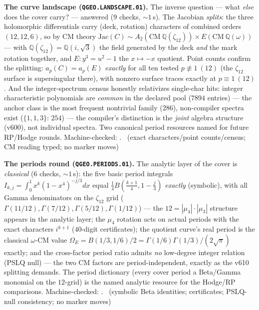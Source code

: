 \documentclass[11pt,a4paper]{article}
\theoremstyle{definition}
\begin{document}
\par\smallskip\noindent\textbf{The curve landscape
(\texttt{QGEO.LANDSCAPE.01}).}
The inverse question --- what \emph{else} does the cover carry? ---
answered ($9$ checks, ${\sim}1$\,s).  The Jacobian \emph{splits}: the
three holomorphic differentials carry (deck, rotation) characters of
combined orders $(12,12,6)$, so by CM theory
$\mathrm{Jac}(C)\sim A_2(\mathrm{CM}\ \mathbb{Q}(\zeta_{12}))\times
E(\mathrm{CM}\ \mathbb{Q}(\omega))$ --- with
$\mathbb{Q}(\zeta_{12})=\mathbb{Q}(i,\sqrt3)$ the field generated by
the deck \emph{and} the mark rotation together, and $E: y^3=u^2-1$
the $x\mapsto-x$ quotient.  Point counts confirm the splitting:
$a_p(C)=a_p(E)$ \emph{exactly} for all ten tested
$p\not\equiv1\ (12)$ (the $\zeta_{12}$ surface is supersingular
there), with nonzero surface traces exactly at $p\equiv1\ (12)$.
And the integer-spectrum census honestly relativizes single-char
hits: integer characteristic polynomials are \emph{common} in the
declared pool ($7894$ entries) --- the anchor class is the most
frequent nontrivial family ($286$), non-compiler spectra exist
($\{1,1,3\}$: $254$) --- the compiler's distinction is the
\emph{joint} algebra structure (v600), not individual spectra.  Two
canonical period resources named for future RP/Hodge rounds.
Machine-checked: .
\mE\ (exact characters/point counts/census; CM reading typed; no
marker moves)
\par\smallskip

\par\smallskip\noindent\textbf{The periods round
(\texttt{QGEO.PERIODS.01}).}
The analytic layer of the cover is \emph{classical} ($6$ checks,
${\sim}1$\,s): the five basic period integrals
$I_{k,j}=\int_0^1x^k(1-x^4)^{-j/3}dx$ equal
$\tfrac14B(\tfrac{k+1}4,1-\tfrac j3)$ \emph{exactly} (symbolic), with
all Gamma denominators on the $\zeta_{12}$ grid
($\Gamma(11/12),\Gamma(7/12),\Gamma(5/12),\Gamma(1/12)$) --- the
$12=|\mu_4|\cdot|\mu_3|$ structure appears in the analytic layer;
the $\mu_4$ rotation acts on actual periods with the exact
characters $i^{k+1}$ ($40$-digit certificates); the quotient curve's
real period is the classical $\omega$-CM value
$\Omega_E=B(1/3,1/6)/2=\Gamma(1/6)\Gamma(1/3)/(2\sqrt\pi)$ exactly;
and the cross-factor period ratio admits \emph{no} low-degree
integer relation (PSLQ null) --- the two CM factors are
period-independent, exactly as the v610 splitting demands.  The
period dictionary (every cover period a Beta/Gamma monomial on the
$12$-grid) is the named analytic resource for the Hodge/RP
comparisons.
Machine-checked: .
\mE\ (symbolic Beta identities; certificates; PSLQ-null consistency;
no marker moves)
\par\smallskip
\end{document}

